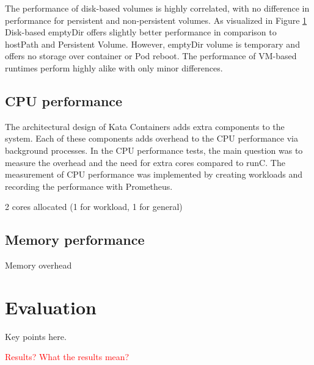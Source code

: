 The performance of disk-based volumes is highly correlated, with no difference in performance for persistent and non-persistent volumes. As visualized in Figure \ref{} Disk-based emptyDir offers slightly better performance in comparison to hostPath and Persistent Volume. However, emptyDir volume is temporary and offers no storage over container or Pod reboot. The performance of VM-based runtimes perform highly alike with only minor differences.



\subsection{CPU performance}

The architectural design of Kata Containers adds extra components to the system. Each of these components adds overhead to the CPU performance via background processes. In the CPU performance tests, the main question was to measure the overhead and the need for extra cores compared to runC. The measurement of CPU performance was implemented by creating workloads and recording the performance with Prometheus. 

2 cores allocated (1 for workload, 1 for general)

\subsection{Memory performance}

Memory overhead

\section{Evaluation}

Key points here.

\textcolor{red}{Results?}
\textcolor{red}{What the results mean?}